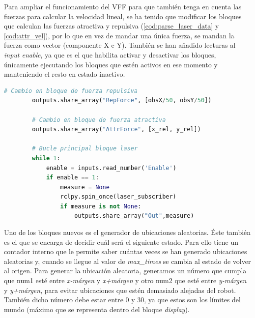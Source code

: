 Para ampliar el funcionamiento del VFF para que también tenga en cuenta las fuerzas para calcular la velocidad lineal, se ha tenido que modificar los bloques que calculan las
fuerzas atractiva y repulsiva (\ref{cod:parse_laser_data} y \ref{cod:attr_vel}), por lo que en vez de mandar una única fuerza, se mandan la fuerza como vector (componente X e Y).
También se han añadido lecturas al \textit{input enable}, ya que es el que habilita activar y desactivar los bloques, únicamente ejecutando los bloques que estén activos en ese
momento y manteniendo el resto en estado inactivo.

\begin{code}[H]
    \begin{lstlisting}[language=python]
        # Cambio en bloque de fuerza repulsiva
        outputs.share_array("RepForce", [obsX/50, obsY/50])

        # Cambio en bloque de fuerza atractiva
        outputs.share_array("AttrForce", [x_rel, y_rel])

        # Bucle principal bloque laser
        while 1:
            enable = inputs.read_number('Enable')
            if enable == 1:
                measure = None
                rclpy.spin_once(laser_subscriber)
                if measure is not None:
                    outputs.share_array("Out",measure)  
    \end{lstlisting}
\end{code}

Uno de los bloques nuevos es el generador de ubicaciones aleatorias. Éste también es el que se encarga de decidir cuál será el siguiente estado. Para ello tiene un contador
interno que le permite saber cuántas veces se han generado ubicaciones aleatorias y, cuando se llegue al valor de \textit{max\_times} se cambia al estado de volver al origen.
Para generar la ubicación aleatoria, generamos un número que cumpla que num1 esté entre \textit{x-márgen} y \textit{x+márgen} y otro num2 que esté entre \textit{y-márgen} y \textit{y+márgen},
para evitar ubicaciones que estén demasiado alejadas del robot. También dicho número debe estar entre 0 y 30, ya que estos son los límites del mundo (máximo que se
representa dentro del bloque \textit{display}).

